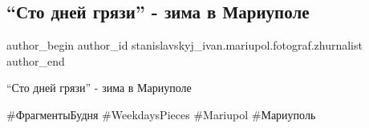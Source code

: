  
 
 
 
 

\subsection{\enquote{Сто дней грязи} - зима в Мариуполе}
\label{sec:22_12_2019.fb.stanislavskyj_ivan.mariupol.fotograf.zhurnalist.1.sto_dnej_grjazi_zima}

\ifcmt
 author_begin
   author_id stanislavskyj_ivan.mariupol.fotograf.zhurnalist
 author_end
\fi

\enquote{Сто дней грязи} - зима в Мариуполе

\#ФрагментыБудня \#WeekdaysPieces \#Mariupol \#Мариуполь


